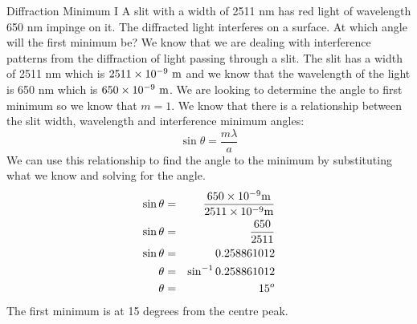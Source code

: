 \begin{wex}{Diffraction Minimum I}
{A slit with a width of 2511 nm has red light of wavelength 650 nm impinge on it. The diffracted light interferes on a surface. At which angle will the first minimum be? }
{
We know that we are dealing with interference patterns from the diffraction of light passing through a slit. The slit has a width of 2511 nm which is $2511 \times 10^{-9}\ \rm{m}$ and we know that the wavelength of the light is 650 nm which is $650 \times 10^{-9}\ \rm{m}$. We are looking to determine the angle to first minimum so we know that $m=1$.
We know that there is a relationship between the slit width, wavelength and interference minimum angles:
\begin{equation*}
\sin\theta = \frac{m\lambda}{a}
\end{equation*}
We can use this relationship to find the angle to the minimum by substituting what we know and solving for the angle.
\begin{eqnarray*}
\sin\theta &=& \frac{650\times 10^{-9} \rm{m}}{2511 \times 10^{-9} \rm{m}} \\
\sin\theta &=& \frac{650}{2511} \\
\sin\theta &=& 0.258861012 \\
\theta &= & \sin^{-1} 0.258861012 \\
\theta &= & 15^o
\end{eqnarray*}
The first minimum is at 15 degrees from the centre peak.
}
\end{wex}

